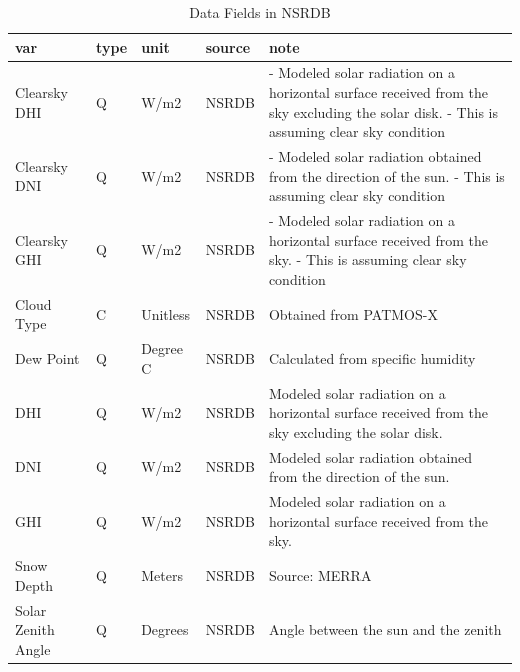 \documentclass[12pt]{article}
\begin{document}
\begin{table}[h!]
\centering
\caption{Data Fields in NSRDB}
\label{fig:nsrdb_var}
\begin{tabular}{p{3cm}p{1cm}p{2cm}lp{7cm}}
  \hline
var                & type & unit                  & source & note                                                                                                                                     \\
  \hline
  \hline
Clearsky DHI       & Q    & W/m2 & NSRDB  & - Modeled solar radiation on a horizontal surface received from the sky excluding the solar disk. - This is assuming clear sky condition \\
Clearsky DNI       & Q    & W/m2 & NSRDB  & - Modeled solar radiation obtained from the direction of the sun. - This is assuming clear sky condition                                 \\
Clearsky GHI       & Q    & W/m2 & NSRDB  & - Modeled solar radiation on a horizontal surface received from the sky. - This is assuming clear sky condition                          \\
Cloud Type         & C    & Unitless              & NSRDB  & Obtained from PATMOS-X                                                                                                                   \\
Dew Point          & Q    & Degree C              & NSRDB  & Calculated from specific humidity                                                                                                        \\
DHI                & Q    & W/m2 & NSRDB  & Modeled solar radiation on a horizontal surface received from the sky excluding the solar disk.                                          \\
DNI                & Q    & W/m2 & NSRDB  & Modeled solar radiation obtained from the direction of the sun.                                                                          \\
GHI                & Q    & W/m2 & NSRDB  & Modeled solar radiation on a horizontal surface received from the sky.                                                                   \\
Snow Depth         & Q    & Meters                & NSRDB  & Source: MERRA                                                                                                                            \\
Solar Zenith Angle & Q    & Degrees               & NSRDB  & Angle between the sun and the zenith                                                                                                     \\

\end{tabular}
\end{table}
\end{document}
